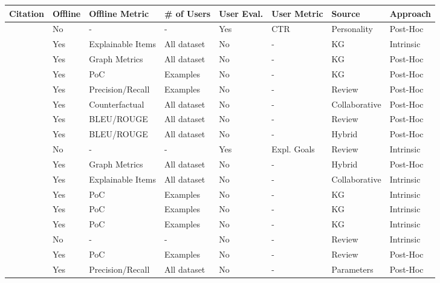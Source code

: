 \begin{xltabular}{\textwidth}{l|l|l|l|l|l|l|l}
    \toprule
    \textbf{Citation} & \textbf{Offline} & \textbf{Offline Metric} & \textbf{\# of Users} & \textbf{User Eval.} & \textbf{User Metric} & \textbf{Source} & \textbf{Approach} \\
    \midrule \midrule
\cite{takami_flanagan_dai_ogata_2023} & No & - & - & Yes & CTR & Personality & Post-Hoc \\
\cite{lin_zhang_lin_zeng_zhou_wu_2024} & Yes & Explainable Items & All dataset & No & - & KG & Intrinsic \\
\cite{zanon_da_rocha_manzato_2024} & Yes & Graph Metrics & All dataset & No & - & KG & Post-Hoc \\
\cite{samih_ghadi_fennan_2023} & Yes & PoC & Examples & No & - & KG & Post-Hoc \\
\cite{li_liu_zhang_kou_liu_qu_2025} & Yes & Precision/Recall & Examples & No & - & Review & Post-Hoc \\
\cite{wen_liu_jing_yu_2024} & Yes & Counterfactual & All dataset & No & - & Collaborative & Post-Hoc \\
\cite{long_jin_2024} & Yes & BLEU/ROUGE & All dataset & No & - & Review & Post-Hoc \\
\cite{jendal_le_lauw_lissandrini_dolog_hose_2024} & Yes & BLEU/ROUGE & All dataset & No & - & Hybrid & Post-Hoc \\
\cite{zhong_negre_2022} & No & - & - & Yes & Expl. Goals & Review & Intrinsic \\
\cite{alizadeh_noughabi_behkamal_zarrinkalam_kahani_2024} & Yes & Graph Metrics & All dataset & No & - & Hybrid & Post-Hoc \\
\cite{zhang_zhu_wang_2023} & Yes & Explainable Items & All dataset & No & - & Collaborative & Intrinsic \\
\cite{zheng_chen_cao_peng_huang_2024} & Yes & PoC & Examples & No & - & KG & Intrinsic \\
\cite{wang_xie_ding_chen_xiang_2025} & Yes & PoC & Examples & No & - & KG & Intrinsic \\
\cite{sang_yang_zhang_liao_2025} & Yes & PoC & Examples & No & - & KG & Intrinsic \\
\cite{9811151} & No & - & - & No & - & Review & Intrinsic \\
\cite{8622439} & Yes & PoC & Examples & No & - & Review & Post-Hoc \\
\cite{10741116} & Yes & Precision/Recall & All dataset & No & - & Parameters & Post-Hoc \\

\end{xltabular}
